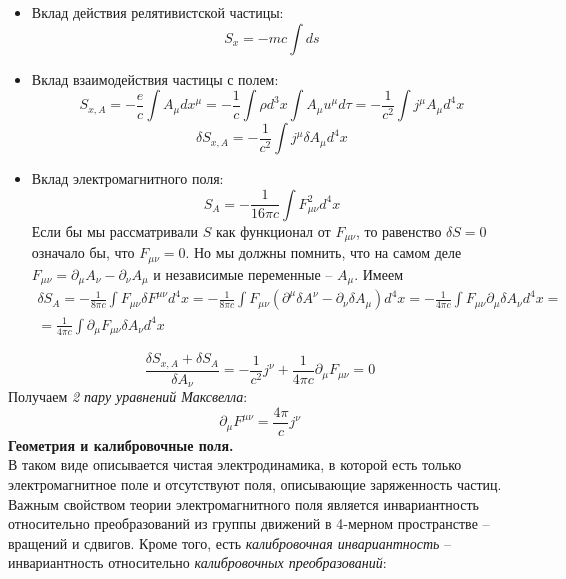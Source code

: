 \documentclass[12pt]{article}
\theoremstyle{definition}
\begin{document}
\begin{itemize}
    \item Вклад действия релятивистской частицы:
    \begin{equation}
        S_x=-mc\int ds
    \end{equation}
    \item Вклад взаимодействия частицы с полем:
    \begin{equation}
        S_{x,A}=-\frac{e}{c}\int A_\mu dx^\mu=-\frac{1}{c}\int\rho d^3x\int A_\mu u^\mu d\tau=-\frac{1}{c^2}\int j^\mu A_\mu d^4x
    \end{equation}
    \begin{equation}
        \delta S_{x,A}=-\frac{1}{c^2}\int j^\mu\delta A_\mu d^4x
    \end{equation}
    \item Вклад электромагнитного поля:
    \begin{equation}
        S_A=-\frac{1}{16\pi c}\int F^2_{\mu\nu}d^4x
    \end{equation}
    Если бы мы рассматривали $S$ как функционал от $F_{\mu\nu}$, то равенство $\delta S = 0$ означало бы, что $F_{\mu\nu} = 0$. Но мы должны помнить, что на самом деле $F_{\mu\nu} = \partial_\mu A_\nu-\partial_\nu A_\mu$ и независимые переменные -- $A_\mu$. Имеем
    \begin{multline}
        \delta S_A=-\frac{1}{8\pi c}\int F_{\mu\nu}\delta F^{\mu\nu}d^4x=-\frac{1}{8\pi c}\int F_{\mu\nu}(\partial^\mu\delta A^\nu-\partial_\nu\delta A_\mu)d^4x=-\frac{1}{4\pi c}\int F_{\mu\nu}\partial_\mu\delta A_\nu d^4x=\\=\frac{1}{4\pi c}\int\partial_\mu F_{\mu\nu}\delta A_\nu d^4x
    \end{multline}
\end{itemize}
\begin{equation}
    \frac{\delta S_{x,A}+\delta S_A}{\delta A_\nu}=-\frac{1}{c^2}j^\nu+\frac{1}{4\pi c}\partial_\mu F_{\mu\nu}=0
\end{equation}
Получаем \textit{2 пару уравнений Максвелла}:
\begin{equation}
    \partial_\mu F^{\mu\nu}=\frac{4\pi}{c}j^\nu
\end{equation}
\textbf{Геометрия и калибровочные поля.}\\
В таком виде описывается чистая электродинамика, в которой есть только электромагнитное поле и отсутствуют поля, описывающие заряженность частиц. Важным свойством теории электромагнитного поля является инвариантность относительно преобразований из группы движений в 4-мерном пространстве -- вращений и сдвигов. Кроме того, есть \textit{калибровочная инвариантность} --  инвариантность относительно \textit{калибровочных преобразований}:
\end{document}
